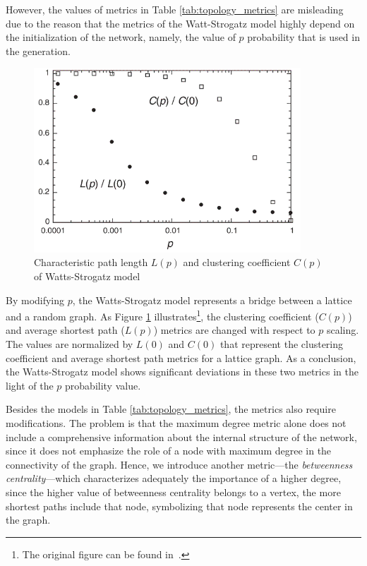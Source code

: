 
However, the values of metrics in Table \ref{tab:topology_metrics} are misleading due to the reason that the metrics of the Watt-Strogatz model highly depend on the initialization of the network, namely, the value of $p$ probability that is used in the generation.

\begin{figure}[!ht]
	\centering
	\includegraphics[width=100mm, keepaspectratio]{figures/ws_metrics.png}
	\caption{Characteristic path length $L(p)$ and clustering coefficient $C(p)$ of Watts-Strogatz model}
	\label{fig:ws}
\end{figure}

By modifying $p$, the Watts-Strogatz model represents a bridge between a lattice and a random graph. As Figure \ref{fig:ws} illustrates\footnote{The original figure can be found in~\cite{ws_metrics}.}, the clustering coefficient ($C(p)$) and average shortest path ($L(p)$) metrics are changed with respect to $p$ scaling. The values are normalized by $L(0)$ and $C(0)$ that represent the clustering coefficient and average shortest path metrics for a lattice graph. As a conclusion, the Watts-Strogatz model shows significant deviations in these two metrics in the light of the $p$ probability value. 

Besides the models in Table \ref{tab:topology_metrics}, the metrics also require modifications. The problem is that the maximum degree metric alone does not include a comprehensive information about the internal structure of the network, since it does not emphasize the role of a node with maximum degree in the connectivity of the graph. Hence, we introduce another metric---the \textit{betweenness centrality}---which characterizes adequately the importance of a higher degree, since the higher value of betweenness centrality belongs to a vertex, the more shortest paths include that node, symbolizing that node represents the center in the graph.


